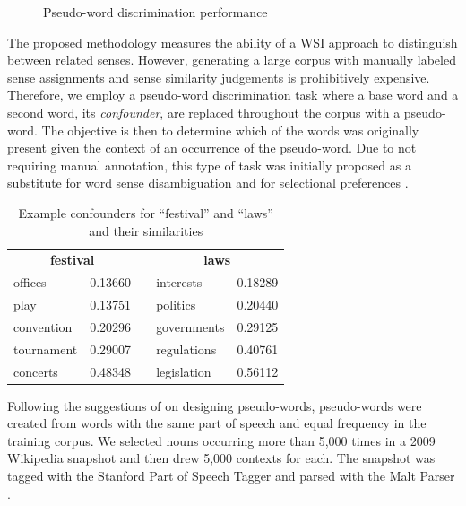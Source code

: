 \documentclass[11pt]{article}
\begin{document}
\begin{figure}
  \caption{Pseudo-word discrimination performance }
  \label{fig:pwd-results}
\end{figure}


The proposed methodology measures the ability of a WSI approach to distinguish
between related senses.  However, generating a large corpus with manually
labeled sense assignments and sense similarity judgements is prohibitively
expensive.  Therefore, we employ a pseudo-word discrimination task
where a base word and a second word, its \emph{confounder}, are replaced
throughout the corpus with a pseudo-word.  The objective is then to determine
which of the words was originally present given the context of an occurrence of
the pseudo-word.  Due to not requiring manual annotation, this type of task
was initially proposed as a substitute for word sense disambiguation
\cite{schutze92context,gale92work} and for selectional
preferences \cite{clark02class}.



\begin{table}[tb]
  \footnotesize
  \center
  \begin{tabular}{ll l ll}
    \toprule
    \multicolumn{2}{c}{\textbf{festival}} && \multicolumn{2}{c}{\textbf{laws}} \\
        \cmidrule{1-2} \cmidrule{4-5} 
    offices    & 0.13660 && interests   & 0.18289 \\
    play       & 0.13751 && politics    & 0.20440 \\
    convention & 0.20296 && governments & 0.29125 \\
    tournament & 0.29007 && regulations & 0.40761 \\
    concerts   & 0.48348 && legislation & 0.56112 \\
    \bottomrule
  \end{tabular}
  \caption{Example confounders for ``festival'' and ``laws'' and their similarities}
  \label{tab:example-confounders}
\end{table}

Following the suggestions of  on designing
pseudo-words, pseudo-words were created from words with the same part of
speech and equal frequency in the training corpus.  We selected nouns occurring
more than 5,000 times in a 2009 Wikipedia snapshot and then drew 5,000 contexts
for each.  The snapshot was tagged with the Stanford Part of Speech Tagger
\cite{toutanova03feature} and parsed with the Malt Parser
\cite{nivre06maltparser}.
\end{document}

